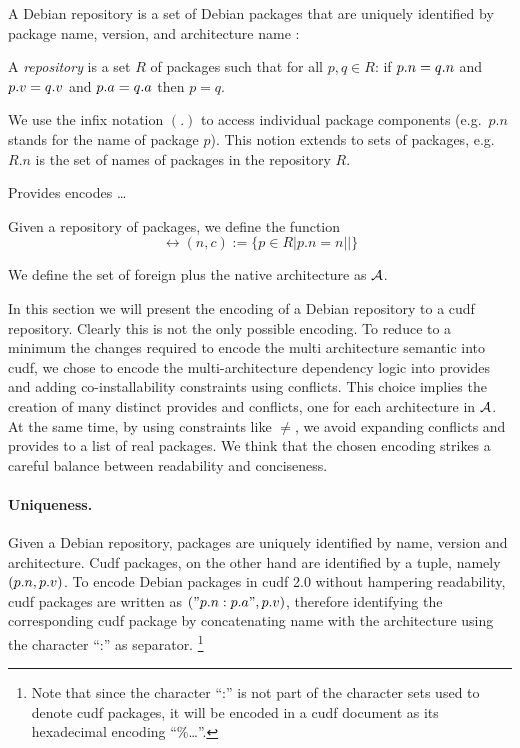 A Debian repository is a set of Debian packages that are uniquely
identified by package name, version, and architecture name :
\begin{definition}
  \label{def:repository}
  A \emph{repository} is a set $R$ of packages such that for all $p, q
  \in R$: if $\name{p}=\name{q}$ and $\version{p}=\version{q}$ and 
  $\arch{p}=\arch{q}$ then $p=q$.
\end{definition}

We use the infix notation $(.)$ to access individual package
components (e.g.~$p.n$ stands for the name of package $p$). This
notion extends to sets of packages, e.g.~$R.n$ is the set of names of
packages in the repository $R$.

Provides encodes \ldots
\begin{definition}
  Given a repository of packages, we define the function 
  \[
    \rel{(n,c)} := \{ p \in R | p.n = n || \}
  \]
\end{definition}

We define the set of foreign plus the native architecture as
$\cal{A}$.

In this section we will present the encoding of a Debian repository to
a cudf repository. Clearly this is not the only possible encoding. To
reduce to a minimum the changes required to encode the multi
architecture semantic into cudf, we chose to encode the
multi-architecture dependency logic into provides and adding
co-installability constraints using conflicts. This choice implies the
creation of many distinct provides and conflicts, one for each
architecture in $\cal{A}$. At the same time, by using constraints like
$\neq$, we avoid expanding conflicts and provides to a list of real
packages. We think that the chosen encoding strikes a careful balance
between readability and conciseness.

\paragraph{Uniqueness.}
Given a Debian repository, packages are uniquely identified by name,
version and architecture. Cudf packages, on the other hand are
identified by a tuple, namely $(\name{p},\version{p})$. To encode
Debian packages in cudf 2.0 without hampering readability, cudf
packages are written as $("\name{p}:\arch{p}",\version{p})$, therefore
identifying the corresponding cudf package by concatenating name with
the architecture using the character ``:'' as separator.
\footnote{Note that since the character ``:'' is not part of the
character sets used to denote cudf packages, it will be encoded in a
cudf document as its hexadecimal encoding ``\%\ldots''.}

